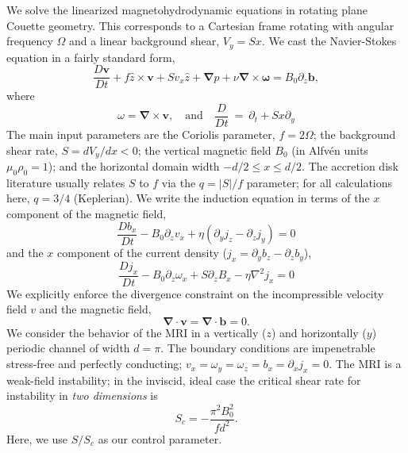 \documentclass[aps,prl,reprint,superscriptaddress]{revtex4-1}
\newcommand{\SSC}{S/S_{c}}
\begin{document}
We solve the linearized magnetohydrodynamic equations in rotating plane Couette geometry.
This corresponds to a Cartesian frame rotating with angular frequency $\Omega$ and a linear background shear, $V_{y} = Sx$. 
We cast the Navier-Stokes equation in a fairly standard form,
\begin{equation}
  \label{eq:mhd}
  \frac{D \mathbf{v}}{Dt} + f \hat{z} \times \mathbf{v} + S v_x \hat{z} + \mathbf{\nabla}{p} + \nu \mathbf{\nabla} \times \mathbf{\omega} = B_{0} \partial_{z} \mathbf{b},
\end{equation}
where
\begin{equation}
\omega = \mathbf{\nabla} \times \mathbf{v}, \quad \text{and} \quad \frac{D}{Dt} \ = \ \partial_{t} + S x \partial_{y}
\end{equation}
The main input parameters are the Coriolis parameter, $f = 2 \Omega$; the background shear rate, $S = dV_{y}/dx < 0$;  the vertical magnetic field $B_{0}$ (in Alfv\'{e}n units $\mu_{0} \rho_{0} = 1$); and the horizontal domain width $-d/2 \le x \le d/2$.
The accretion disk literature usually relates $S$ to $f$ via the $q = |S|/f$ parameter; for all calculations here, $q = 3/4$ (Keplerian).
We write the induction equation in terms of the $x$ component of the magnetic field,
\begin{equation}
  \label{eq:Bx}
  \frac{D b_x}{Dt} - B_0 \partial_z v_x + \eta (\partial_y j_z - \partial_z j_y) = 0
\end{equation}
and the $x$ component of the current density ($j_{x} = \partial_{y}b_{z} - \partial_{z} b_{y}$),
\begin{equation}
  \label{eq:Jx}
  \frac{D j_x}{Dt} - B_0 \partial_z \omega_x + S \partial_z B_x - \eta \nabla^2 j_x = 0
\end{equation}
We explicitly enforce the divergence constraint on the incompressible velocity field $v$ and the magnetic field,
\begin{equation}
  \label{eq:divu}
  \mathbf{\nabla} \cdot \mathbf{v} = \mathbf{\nabla} \cdot \mathbf{b} = 0.
\end{equation}
We consider the behavior of the MRI in a vertically ($z$) and horizontally ($y$) periodic channel of width $d = \pi$. The boundary conditions are impenetrable stress-free and perfectly conducting; $v_{x} = \omega_{y} = \omega_{z} = b_{x} = \partial_{x}j_{x} = 0$. The MRI is a weak-field instability; in the inviscid, ideal case the critical shear rate for instability in \textit{two dimensions} is
\begin{equation}
  \label{eq:Sc}
  S_c = -\frac{\pi^2 B_{0}^2}{f d^2}.
\end{equation}
Here, we use $\SSC$ as our control parameter. 
\end{document}
